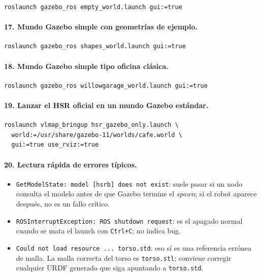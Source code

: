 \documentclass[11pt,a4paper]{article}
\begin{document}
\begin{verbatim}
roslaunch gazebo_ros empty_world.launch gui:=true
\end{verbatim}

\paragraph{17. Mundo Gazebo simple con geometrías de ejemplo.}

\begin{verbatim}
roslaunch gazebo_ros shapes_world.launch gui:=true
\end{verbatim}

\paragraph{18. Mundo Gazebo simple tipo oficina clásica.}

\begin{verbatim}
roslaunch gazebo_ros willowgarage_world.launch gui:=true
\end{verbatim}

\paragraph{19. Lanzar el HSR oficial en un mundo Gazebo estándar.}

\begin{verbatim}
roslaunch vlmap_bringup hsr_gazebo_only.launch \
  world:=/usr/share/gazebo-11/worlds/cafe.world \
  gui:=true use_rviz:=true
\end{verbatim}

\paragraph{20. Lectura rápida de errores típicos.}

\begin{itemize}
  \item \texttt{GetModelState: model [hsrb] does not exist}: suele pasar si un
        nodo consulta el modelo antes de que Gazebo termine el \emph{spawn}; si
        el robot aparece después, no es un fallo crítico.
  \item \texttt{ROSInterruptException: ROS shutdown request}: es el apagado
        normal cuando se mata el launch con \texttt{Ctrl+C}; no indica bug.
  \item \texttt{Could not load resource ... torso.std}: eso sí es una
        referencia errónea de malla. La malla correcta del torso es
        \texttt{torso.stl}; conviene corregir cualquier URDF generado que siga
        apuntando a \texttt{torso.std}.
\end{itemize}
\end{document}
